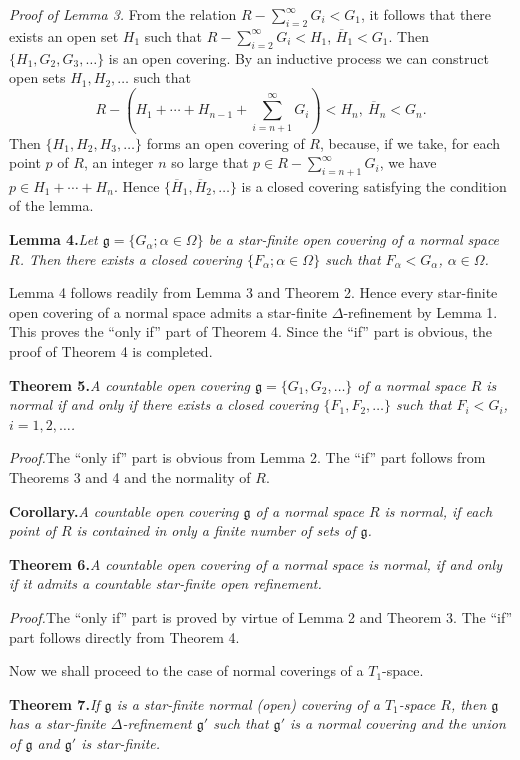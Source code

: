 \documentclass[11pt,a4paper,leqno]{article}
\newcommand{\g}{\mathfrak g}
\newcommand{\thm}[2]{\par\medskip\textbf{Theorem #1.}\quad\textit{#2}\par}
\newcommand{\lem}[2]{\par\medskip\textbf{Lemma #1.}\quad\textit{#2}\par}
\newcommand{\proof}{\textit{Proof.}\quad}
\begin{document}
\textit{Proof of Lemma 3.} From the relation $R-\sum_{i=2}^{\infty}G_i<G_1$, it follows that there exists an open set $H_1$ such that $R-\sum_{i=2}^{\infty}G_i<H_1$, $\overline H_1<G_1$. Then $\{H_1,G_2,G_3,\ldots\}$ is an open covering. By an inductive process we can construct open sets $H_1,H_2,\ldots$ such that
\[
R-(H_1+\cdots+H_{n-1}+\sum_{i=n+1}^{\infty}G_i)<H_n,\ \overline H_n<G_n.
\]
Then $\{H_1,H_2,H_3,\ldots\}$ forms an open covering of $R$, because, if we take, for each point $p$ of $R$, an integer $n$ so large that $p\in R-\sum_{i=n+1}^{\infty}G_i$, we have $p\in H_1+\cdots+H_n$. Hence $\{\overline H_1,\overline H_2,\ldots\}$ is a closed covering satisfying the condition of the lemma.

\lem{4}{Let $\g=\{G_\alpha;\alpha\in\Omega\}$ be a star-finite open covering of a normal space $R$. Then there exists a closed covering $\{F_\alpha;\alpha\in\Omega\}$ such that $F_\alpha<G_\alpha$, $\alpha\in\Omega$.}

Lemma 4 follows readily from Lemma 3 and Theorem 2. Hence every star-finite open covering of a normal space admits a star-finite $\Delta$-refinement by Lemma 1. This proves the ``only if'' part of Theorem 4. Since the ``if'' part is obvious, the proof of Theorem 4 is completed.
\newpage
\thm{5}{A countable open covering $\g=\{G_1,G_2,\ldots\}$ of a normal space $R$ is normal if and only if there exists a closed covering $\{F_1,F_2,\ldots\}$ such that $F_i<G_i$, $i=1,2,\ldots$.}

\proof The ``only if'' part is obvious from Lemma 2. The ``if'' part follows from Theorems 3 and 4 and the normality of $R$.

\textbf{Corollary.}\quad\textit{A countable open covering $\g$ of a normal space $R$ is normal, if each point of $R$ is contained in only a finite number of sets of $\g$.}

\thm{6}{A countable open covering of a normal space is normal, if and only if it admits a countable star-finite open refinement.}

\proof The ``only if'' part is proved by virtue of Lemma 2 and Theorem 3. The ``if'' part follows directly from Theorem 4.

Now we shall proceed to the case of normal coverings of a $T_1$-space.

\thm{7}{If $\g$ is a star-finite normal (open) covering of a $T_1$-space $R$, then $\g$ has a star-finite $\Delta$-refinement $\g'$ such that $\g'$ is a normal covering and the union of $\g$ and $\g'$ is star-finite.}
\end{document}
